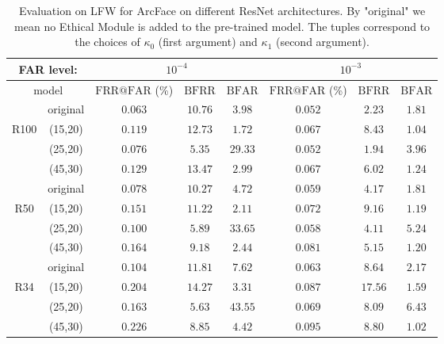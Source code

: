 \documentclass[nohyperref]{article}
\theoremstyle{plain}
\theoremstyle{definition}
\theoremstyle{remark}
\begin{document}
\begin{table*}
\center
\caption{Evaluation on LFW for ArcFace on different ResNet architectures. By "original" we mean no Ethical Module is added to the pre-trained model. The tuples correspond to the choices of $\kappa_0$ (first argument) and $\kappa_1$ (second argument).}
\begin{tabular}{ c | c | ccc | ccc}
 \multicolumn{2}{c}{ FAR level: }         & \multicolumn{3}{c}{ $10^{-4}$} & \multicolumn{3}{c}{ $10^{-3}$} \\ 
 \hline \hline
  \multicolumn{2}{c}{model}    & $\mathrm{FRR}@\mathrm{FAR}$ (\%)  & $\mathrm{BFRR}$  & $\mathrm{BFAR}$  & $\mathrm{FRR}@\mathrm{FAR}$ (\%)  & $\mathrm{BFRR}$        & $\mathrm{BFAR}$        \\ \hline
                              & original  & $\mathbf{0.063}$ & $10.76$ & $3.98$  & $\mathbf{0.052}$  & $2.23$ & $1.81$  \\
  \multirow{2}{*}{R100}        & (15,20) & $0.119$ & $12.73$ & $\mathbf{1.72}$ & $0.067$  & $8.43$ &  $\mathbf{1.04}$ \\
                              & (25,20) & $0.076$ & $\mathbf{5.35}$ & $29.33$ & $0.052$ & $\mathbf{1.94}$ & $3.96$  \\
                              & (45,30) & $0.129$ & $13.47$ & $2.99$ & $0.067$  & $6.02$ & $1.24$  \\ \hline     
                              & original  & $\mathbf{0.078}$ & $10.27$ & $4.72$ & $0.059$  & $4.17$ & $1.81$ \\
  \multirow{2}{*}{R50}        & (15,20) & $0.151$ & $11.22$ & $\mathbf{2.11}$ & $0.072$  & $9.16$ & $\mathbf{1.19}$  \\
                              & (25,20) & $0.100$ & $\mathbf{5.89}$ & $33.65$ & $\mathbf{0.058}$ & $\mathbf{4.11}$ & $5.24$  \\
                              & (45,30) & $0.164$ & $9.18$ & $2.44$ & $0.081$  & $5.15$ & $1.20$  \\ \hline 
                              & original  & $\mathbf{0.104}$ & $11.81$ & $7.62$ & $\mathbf{0.063}$  & $8.64$ & $2.17$ \\
\multirow{2}{*}{R34}          & (15,20) & $0.204$ & $14.27$ & $\mathbf{3.31}$ & $0.087$  & $17.56$ & $1.59$  \\
                              & (25,20) & $0.163$ & $\mathbf{5.63}$ & $43.55$ & $0.069$  & $\mathbf{8.09}$ & $6.43$ \\
                              & (45,30) & $0.226$ & $8.85$ & $4.42$ & $0.095$  & $8.80$ & $\mathbf{1.02}$  \\ \hline 

\end{tabular}
\end{table*}
\end{document}
